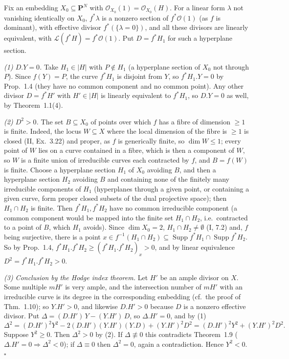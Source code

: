 \documentclass[11pt]{article}
\begin{document}
Fix an embedding $X_0\subseteq\mathbf P^N$ with $\mathcal O_{X_0}(1)=\mathcal O_{X_0}(H)$. For a linear form $\lambda$ not vanishing identically on $X_0$, $f^*\lambda$ is a nonzero section of $f^*\mathcal O(1)$ (as $f$ is dominant), with effective divisor $f^*(\{\lambda=0\})$, and all these divisors are linearly equivalent, with $\mathcal L(f^*H)=f^*\mathcal O(1)$. Put $D=f^*H_1$ for such a hyperplane section.

\emph{(1) $D.Y=0$.} Take $H_1\in|H|$ with $P\notin H_1$ (a hyperplane section of $X_0$ not through $P$). Since $f(Y)=P$, the curve $f^*H_1$ is disjoint from $Y$, so $f^*H_1.Y=0$ by Prop.~1.4 (they have no common component and no common point). Any other divisor $D=f^*H'$ with $H'\in|H|$ is linearly equivalent to $f^*H_1$, so $D.Y=0$ as well, by Theorem~1.1(4).

\emph{(2) $D^2>0$.} The set $B\subseteq X_0$ of points over which $f$ has a fibre of dimension $\ge1$ is finite. Indeed, the locus $W\subseteq X$ where the local dimension of the fibre is $\ge1$ is closed (II, Ex.~3.22) and proper, as $f$ is generically finite, so $\dim W\le1$; every point of $W$ lies on a curve contained in a fibre, which is then a component of $W$, so $W$ is a finite union of irreducible curves each contracted by $f$, and $B=f(W)$ is finite. Choose a hyperplane section $H_1$ of $X_0$ avoiding $B$, and then a hyperplane section $H_2$ avoiding $B$ and containing none of the finitely many irreducible components of $H_1$ (hyperplanes through a given point, or containing a given curve, form proper closed subsets of the dual projective space); then $H_1\cap H_2$ is finite. Then $f^*H_1,f^*H_2$ have no common irreducible component (a common component would be mapped into the finite set $H_1\cap H_2$, i.e.\ contracted to a point of $B$, which $H_1$ avoids). Since $\dim X_0=2$, $H_1\cap H_2\neq\emptyset$ (I, 7.2) and, $f$ being surjective, there is a point $x\in f^{-1}(H_1\cap H_2)\subseteq\operatorname{Supp}f^*H_1\cap\operatorname{Supp}f^*H_2$. So by Prop.~1.4, $f^*H_1.f^*H_2\ge(f^*H_1.f^*H_2)_x>0$, and by linear equivalence $D^2=f^*H_1.f^*H_2>0$.

\emph{(3) Conclusion by the Hodge index theorem.} Let $H'$ be an ample divisor on $X$. Some multiple $mH'$ is very ample, and the intersection number of $mH'$ with an irreducible curve is its degree in the corresponding embedding (cf.\ the proof of Thm.~1.10); so $Y.H'>0$, and likewise $D.H'>0$ because $D$ is a nonzero effective divisor. Put $\Delta=(D.H')\,Y-(Y.H')\,D$, so $\Delta.H'=0$, and by (1)
\[
\Delta^2=(D.H')^2Y^2-2(D.H')(Y.H')(Y.D)+(Y.H')^2D^2=(D.H')^2Y^2+(Y.H')^2D^2 .
\]
Suppose $Y^2\ge0$. Then $\Delta^2>0$ by (2). If $\Delta\not\equiv0$ this contradicts Theorem~1.9 ($\Delta.H'=0\Rightarrow\Delta^2<0$); if $\Delta\equiv0$ then $\Delta^2=0$, again a contradiction. Hence $Y^2<0$. \hfill$\square$
\end{document}
